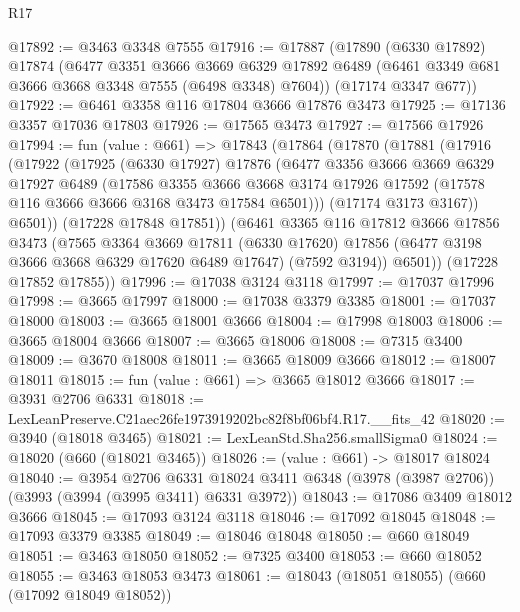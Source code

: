 \begin{lexlean}{R17}
\begin{coremodule}
@17892 := @3463 @3348 @7555
@17916 := @17887
    (@17890
      (@6330 @17892)
      @17874
      (@6477
        @3351
        @3666
        @3669
        @6329
        @17892
        @6489
        (@6461 @3349 @681 @3666 @3668 @3348 @7555 (@6498 @3348) @7604))
      (@17174 @3347 @677))
@17922 := @6461 @3358 @116 @17804 @3666 @17876 @3473
@17925 := @17136 @3357 @17036 @17803
@17926 := @17565 @3473
@17927 := @17566 @17926
@17994 := fun (value : @661) =>
  @17843
    (@17864
      (@17870
        (@17881
          (@17916
            (@17922
              (@17925
                (@6330 @17927)
                @17876
                (@6477
                  @3356
                  @3666
                  @3669
                  @6329
                  @17927
                  @6489
                  (@17586
                    @3355
                    @3666
                    @3668
                    @3174
                    @17926
                    @17592
                    (@17578 @116 @3666 @3666 @3168 @3473 @17584 @6501)))
                (@17174 @3173 @3167))
              @6501))
          (@17228 @17848 @17851))
        (@6461
          @3365
          @116
          @17812
          @3666
          @17856
          @3473
          (@7565
            @3364
            @3669
            @17811
            (@6330 @17620)
            @17856
            (@6477 @3198 @3666 @3668 @6329 @17620 @6489 @17647)
            (@7592 @3194))
          @6501))
      (@17228 @17852 @17855))
@17996 := @17038 @3124 @3118
@17997 := @17037 @17996
@17998 := @3665 @17997
@18000 := @17038 @3379 @3385
@18001 := @17037 @18000
@18003 := @3665 @18001 @3666
@18004 := @17998 @18003
@18006 := @3665 @18004 @3666
@18007 := @3665 @18006
@18008 := @7315 @3400
@18009 := @3670 @18008
@18011 := @3665 @18009 @3666
@18012 := @18007 @18011
@18015 := fun (value : @661) => @3665 @18012 @3666
@18017 := @3931 @2706 @6331
@18018 := LexLeanPreserve.C21aec26fe1973919202bc82f8bf06bf4.R17.__fits_42
@18020 := @3940 (@18018 @3465)
@18021 := LexLeanStd.Sha256.smallSigma0
@18024 := @18020 (@660 (@18021 @3465))
@18026 := (value : @661) -> @18017 @18024
@18040 := @3954
    @2706
    @6331
    @18024
    @3411
    @6348
    (@3978 (@3987 @2706))
    (@3993 (@3994 (@3995 @3411) @6331 @3972))
@18043 := @17086 @3409 @18012 @3666
@18045 := @17093 @3124 @3118
@18046 := @17092 @18045
@18048 := @17093 @3379 @3385
@18049 := @18046 @18048
@18050 := @660 @18049
@18051 := @3463 @18050
@18052 := @7325 @3400
@18053 := @660 @18052
@18055 := @3463 @18053 @3473
@18061 := @18043 (@18051 @18055) (@660 (@17092 @18049 @18052))

\end{coremodule}
\end{lexlean}
